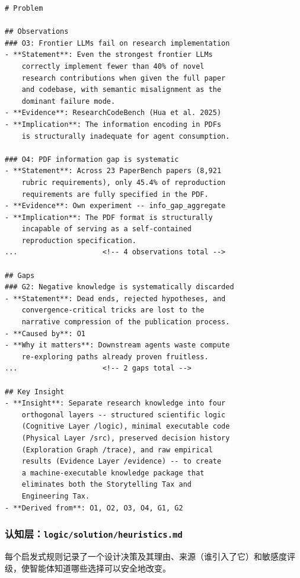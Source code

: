 \documentclass[
]{article}
\theoremstyle{definition}
\begin{document}
\begin{lstlisting}
# Problem

## Observations
### O3: Frontier LLMs fail on research implementation
- **Statement**: Even the strongest frontier LLMs
    correctly implement fewer than 40% of novel
    research contributions when given the full paper
    and codebase, with semantic misalignment as the
    dominant failure mode.
- **Evidence**: ResearchCodeBench (Hua et al. 2025)
- **Implication**: The information encoding in PDFs
    is structurally inadequate for agent consumption.

### O4: PDF information gap is systematic
- **Statement**: Across 23 PaperBench papers (8,921
    rubric requirements), only 45.4% of reproduction
    requirements are fully specified in the PDF.
- **Evidence**: Own experiment -- info_gap_aggregate
- **Implication**: The PDF format is structurally
    incapable of serving as a self-contained
    reproduction specification.
...                    <!-- 4 observations total -->

## Gaps
### G2: Negative knowledge is systematically discarded
- **Statement**: Dead ends, rejected hypotheses, and
    convergence-critical tricks are lost to the
    narrative compression of the publication process.
- **Caused by**: O1
- **Why it matters**: Downstream agents waste compute
    re-exploring paths already proven fruitless.
...                    <!-- 2 gaps total -->

## Key Insight
- **Insight**: Separate research knowledge into four
    orthogonal layers -- structured scientific logic
    (Cognitive Layer /logic), minimal executable code
    (Physical Layer /src), preserved decision history
    (Exploration Graph /trace), and raw empirical
    results (Evidence Layer /evidence) -- to create
    a machine-executable knowledge package that
    eliminates both the Storytelling Tax and
    Engineering Tax.
- **Derived from**: O1, O2, O3, O4, G1, G2
\end{lstlisting}

\subsubsection{\texorpdfstring{认知层：\texttt{logic/solution/heuristics.md}}{认知层：logic/solution/heuristics.md}}\label{ux8ba4ux77e5ux5c42logicsolutionheuristics.md}

每个启发式规则记录了一个设计决策及其理由、来源（谁引入了它）和敏感度评级，使智能体知道哪些选择可以安全地改变。
\end{document}
